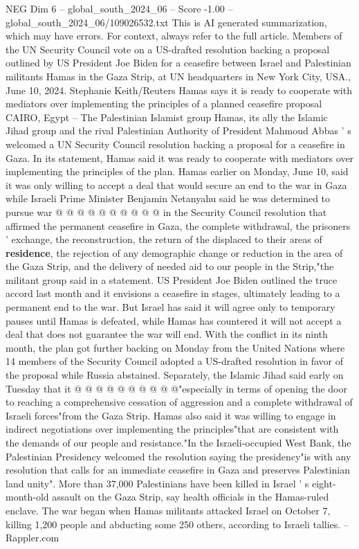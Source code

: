\begin{textsample}{NEG Dim 6 – global\_south\_2024\_06 – Score -1.00 – global\_south\_2024\_06/109026532.txt}  \label{ex:f6_neg_298}
This is AI generated summarization, which may have errors.
For context, always refer to the full article.
Members of the UN Security Council vote on a US-drafted resolution backing a proposal outlined by US President Joe Biden for a ceasefire between Israel and Palestinian militants Hamas in the Gaza Strip, at UN headquarters in New York City, USA., June 10, 2024.
Stephanie Keith/Reuters Hamas says it is ready to cooperate with mediators over implementing the principles of a planned ceasefire proposal CAIRO, Egypt -- The Palestinian Islamist group Hamas, its ally the Islamic Jihad group and the rival Palestinian Authority of President Mahmoud Abbas ' s welcomed a UN Security Council resolution backing a proposal for a ceasefire in Gaza.
In its statement, Hamas said it was ready to cooperate with mediators over implementing the principles of the plan.
Hamas earlier on Monday, June 10, said it was only willing to accept a deal that would secure an end to the war in Gaza while Israeli Prime Minister Benjamin Netanyahu said he was determined to pursue war @ @ @ @ @ @ @ @ @ @ in the Security Council resolution that affirmed the permanent ceasefire in Gaza, the complete withdrawal, the prisoners ' exchange, the reconstruction, the return of the displaced to their areas of \textbf{residence}, the rejection of any demographic change or reduction in the area of the Gaza Strip, and the delivery of needed aid to our people in the Strip,"the militant group said in a statement.
US President Joe Biden outlined the truce accord last month and it envisions a ceasefire in stages, ultimately leading to a permanent end to the war.
But Israel has said it will agree only to temporary pauses until Hamas is defeated, while Hamas has countered it will not accept a deal that does not guarantee the war will end.
With the conflict in its ninth month, the plan got further backing on Monday from the United Nations where 14 members of the Security Council adopted a US-drafted resolution in favor of the proposal while Russia abstained.
Separately, the Islamic Jihad said early on Tuesday that it @ @ @ @ @ @ @ @ @ @"especially in terms of opening the door to reaching a comprehensive cessation of aggression and a complete withdrawal of Israeli forces"from the Gaza Strip.
Hamas also said it was willing to engage in indirect negotiations over implementing the principles"that are consistent with the demands of our people and resistance."In the Israeli-occupied West Bank, the Palestinian Presidency welcomed the resolution saying the presidency"is with any resolution that calls for an immediate ceasefire in Gaza and preserves Palestinian land unity".
More than 37,000 Palestinians have been killed in Israel ' s eight-month-old assault on the Gaza Strip, say health officials in the Hamas-ruled enclave.
The war began when Hamas militants attacked Israel on October 7, killing 1,200 people and abducting some 250 others, according to Israeli tallies. -- Rappler.com

\end{textsample}
